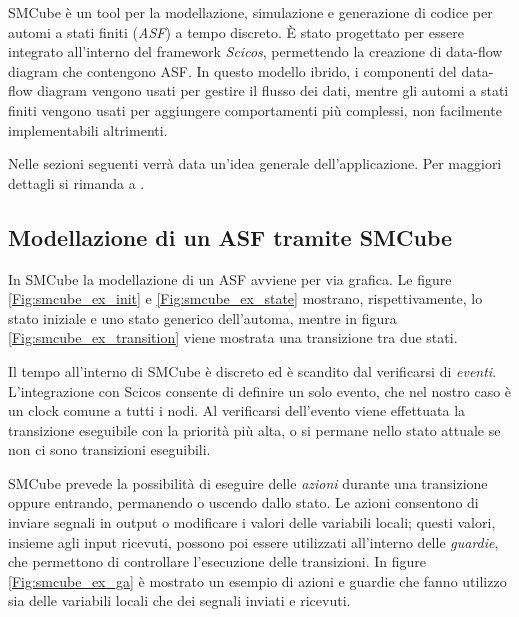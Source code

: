 SMCube\cite{smcube} è un tool per la modellazione, simulazione e generazione di codice per automi a stati finiti (\textsl{ASF}) a tempo discreto. È stato progettato per essere integrato all'interno del framework \textit{Scicos}\cite{scicos}, permettendo la creazione di data-flow diagram che contengono ASF. In questo modello ibrido, i componenti del data-flow diagram vengono usati per gestire il flusso dei dati, mentre gli automi a stati finiti vengono usati per aggiungere comportamenti più complessi, non facilmente implementabili altrimenti.

Nelle sezioni seguenti verrà data un'idea generale dell'applicazione. Per maggiori dettagli si rimanda a \cite{smcube_man}.

\subsection{Modellazione di un ASF tramite SMCube}
In SMCube la modellazione di un ASF avviene per via grafica. Le figure \ref{Fig:smcube_ex_init} e \ref{Fig:smcube_ex_state} mostrano, rispettivamente, lo stato iniziale e uno stato generico dell'automa, mentre in figura \ref{Fig:smcube_ex_transition} viene mostrata una transizione tra due stati.

Il tempo all'interno di SMCube è discreto ed è scandito dal verificarsi di \textsl{eventi}. L'integrazione con Scicos consente di definire un solo evento, che nel nostro caso è un clock comune a tutti i nodi. Al verificarsi dell'evento viene effettuata la transizione eseguibile con la priorità più alta, o si permane nello stato attuale se non ci sono transizioni eseguibili.

SMCube prevede la possibilità di eseguire delle \textsl{azioni} durante una transizione oppure entrando, permanendo o uscendo dallo stato. Le azioni consentono di inviare segnali in output o modificare i valori delle variabili locali; questi valori, insieme agli input ricevuti, possono poi essere utilizzati all'interno delle \textsl{guardie}, che permettono di controllare l'esecuzione delle transizioni. In figure \ref{Fig:smcube_ex_ga} è mostrato un esempio di azioni e guardie che fanno utilizzo sia delle variabili locali che dei segnali inviati e ricevuti.


